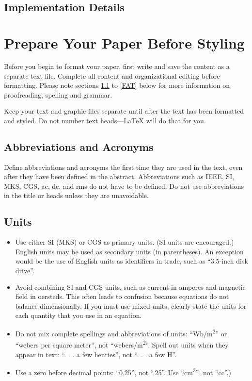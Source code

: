 \documentclass[conference]{IEEEtran}
\begin{document}
\subsection{Implementation Details}



\section{Prepare Your Paper Before Styling}
Before you begin to format your paper, first write and save the content as a 
separate text file. Complete all content and organizational editing before 
formatting. Please note sections \ref{AA} to \ref{FAT} below for more information on 
proofreading, spelling and grammar.

Keep your text and graphic files separate until after the text has been 
formatted and styled. Do not number text heads---{\LaTeX} will do that 
for you.

\subsection{Abbreviations and Acronyms}\label{AA}
Define abbreviations and acronyms the first time they are used in the text, 
even after they have been defined in the abstract. Abbreviations such as 
IEEE, SI, MKS, CGS, ac, dc, and rms do not have to be defined. Do not use 
abbreviations in the title or heads unless they are unavoidable.

\subsection{Units}
\begin{itemize}
\item Use either SI (MKS) or CGS as primary units. (SI units are encouraged.) English units may be used as secondary units (in parentheses). An exception would be the use of English units as identifiers in trade, such as ``3.5-inch disk drive''.
\item Avoid combining SI and CGS units, such as current in amperes and magnetic field in oersteds. This often leads to confusion because equations do not balance dimensionally. If you must use mixed units, clearly state the units for each quantity that you use in an equation.
\item Do not mix complete spellings and abbreviations of units: ``Wb/m\textsuperscript{2}'' or ``webers per square meter'', not ``webers/m\textsuperscript{2}''. Spell out units when they appear in text: ``. . . a few henries'', not ``. . . a few H''.
\item Use a zero before decimal points: ``0.25'', not ``.25''. Use ``cm\textsuperscript{3}'', not ``cc''.)
\end{itemize}
\end{document}
